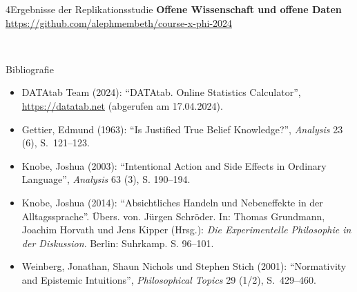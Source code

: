 \documentclass[xcolor=table,9pt,aspectratio=169]{beamer}
\begin{document}
\begin{frame}{\vspace*{10mm}4\hspace*{1em}Ergebnisse der Replikationsstudie}
\textbf{Offene Wissenschaft und offene Daten}\\
\smallskip
\url{https://github.com/alephmembeth/course-x-phi-2024}

\bigskip
\begin{center}
   \\
\end{center}
\end{frame}


\begin{frame}{\vspace*{10mm}Bibliografie}
\vspace*{-5mm}
{\footnotesize
\begin{itemize}[label=,leftmargin=2em,itemindent=-2em]
   \item DATAtab Team (2024): \enquote{DATAtab. Online Statistics Calculator}, \url{https://datatab.net} (abgerufen am 17.04.2024).
   \item Gettier, Edmund (1963): \enquote{Is Justified True Belief Knowledge?}, \textit{Analysis} 23 (6), S.~121--123.
   \item Knobe, Joshua (2003): \enquote{Intentional Action and Side Effects in Ordinary Language}, \textit{Analysis} 63 (3), S. 190--194.
   \item Knobe, Joshua (2014): \enquote{Absichtliches Handeln und Nebeneffekte in der Alltagssprache}. Übers. von. Jürgen Schröder. In: Thomas Grundmann, Joachim Horvath und Jens Kipper (Hrsg.): \textit{Die Experimentelle Philosophie in der Diskussion}. Berlin: Suhrkamp. S. 96--101.
   \item Weinberg, Jonathan, Shaun Nichols und Stephen Stich (2001): \enquote{Normativity and Epistemic Intuitions}, \textit{Philosophical Topics} 29 (1/2), S.~429--460.
\end{itemize}
}
\end{frame}
\end{document}
